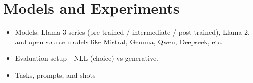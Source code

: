 \section{Models and Experiments}

\begin{itemize}
  \item Models: Llama 3 series (pre-trained / intermediate / post-trained), Llama 2, and open source models like Mistral, Gemma, Qwen, Deepseek, etc.
  \item Evaluation setup - NLL (choice) vs generative.
  \item Tasks, prompts, and shots
\end{itemize}
